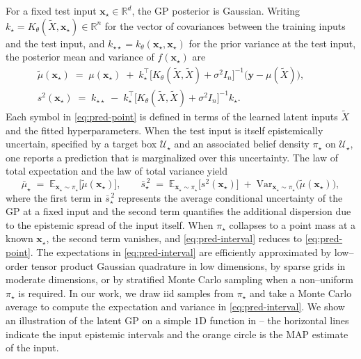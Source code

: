 \documentclass[a4paper,12pt]{article}
\newcommand{\x}{\mathbf{x}}
\begin{document}
For a fixed test input $\x_\star\in\mathbb{R}^d$, the GP posterior is Gaussian. Writing $k_\star=K_\theta(\tilde{X},\x_\star)\in\mathbb{R}^{n}$ for the vector of covariances between the training inputs and the test input, and $k_{\star\star}=k_\theta(\x_\star,\x_\star)$ for the prior variance at the test input, the posterior mean and variance of $f(\x_\star)$ are
\begin{equation}
\label{eq:pred-point}
\begin{split}
\tilde \mu(\x_\star) \;=\; \mu(\x_\star) \;+\; k_\star^\top\!\Big[K_\theta(\tilde{X},\tilde{X})+\sigma^2 I_n\Big]^{-1}\!\big(\mathbf{y}-\mu(\tilde{X})\big),
\qquad \\
s^2(\x_\star) \;=\; k_{\star\star} \;-\; k_\star^\top\!\Big[K_\theta(\tilde{X},\tilde{X})+\sigma^2 I_n\Big]^{-1}\!k_\star.
\end{split}
\end{equation}
Each symbol in \eqref{eq:pred-point} is defined in terms of the learned latent inputs $\tilde{X}$ and the fitted hyperparameters. When the test input is itself epistemically uncertain, specified by a target box $\mathcal{U}_\star$ and an associated belief density $\pi_\star$ on $\mathcal{U}_\star$, one reports a prediction that is marginalized over this uncertainty. The law of total expectation and the law of total variance yield
\begin{equation}
\label{eq:pred-interval}
\bar{\mu}_\star \;=\; \mathbb{E}_{\x_\star\sim \pi_\star}\!\big[\tilde \mu(\x_\star)\big],
\qquad
\bar{s}^{\,2}_\star \;=\; \mathbb{E}_{\x_\star\sim \pi_\star}\!\big[s^2(\x_\star)\big]
\;+\; \mathrm{Var}_{\x_\star\sim \pi_\star}\!\big(\tilde \mu(\x_\star)\big),
\end{equation}
where the first term in $\bar{s}^{\,2}_\star$ represents the average conditional uncertainty of the GP at a fixed input and the second term quantifies the additional dispersion due to the epistemic spread of the input itself. When $\pi_\star$ collapses to a point mass at a known $\x_\star$, the second term vanishes, and \eqref{eq:pred-interval} reduces to \eqref{eq:pred-point}. The expectations in \eqref{eq:pred-interval} are efficiently approximated by low–order tensor product Gaussian quadrature in low dimensions, by sparse grids in moderate dimensions, or by stratified Monte Carlo sampling when a non–uniform $\pi_\star$ is required. In our work, we draw iid samples from $\pi_\star$ and take a Monte Carlo average to compute the expectation and variance in \eqref{eq:pred-interval}. We show an illustration of the latent GP on a simple $1$D function in  -- the horizontal lines indicate the input epistemic intervals and the orange circle is the MAP estimate of the input.
\end{document}
